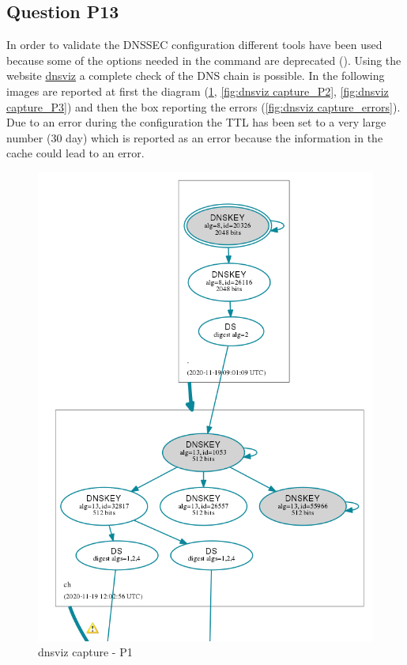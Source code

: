 \subsection{Question P13}
In order to validate the DNSSEC configuration different tools have been used because some of the options needed in the  command are deprecated (). Using the website \href{www.dnsviz.net}{dnsviz} a complete check of the DNS chain is possible. In the following images are reported at first the diagram (\ref{fig:dnsviz capture_P1}, \ref{fig:dnsviz capture_P2}, \ref{fig:dnsviz capture_P3}) and then the box reporting the errors (\ref{fig:dnsviz capture_errors}). Due to an error during the configuration the TTL has been set to a very large number (30 day) which is reported as an error because the information in the cache could lead to an error.
\begin{figure}[H]
	\centering
	\includegraphics[width=0.7\linewidth]{images/dnspath1.png}
	\caption{dnsviz capture - P1}
	\label{fig:dnsviz capture_P1}
\end{figure}
